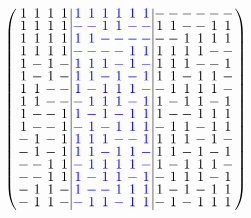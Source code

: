 \documentclass{beamer}
\newcommand{\bblue}[1]{\textcolor{blue}{#1}}
\begin{document}
\begin{frame}

  \[
      \arraycolsep=1.0pt\def\arraystretch{0.75}
      \left(\begin{array}{cccc|cccccc|cccccc}
            1&1&1&1&\bblue{1}&\bblue{1}&\bblue{1}&\bblue{1}&\bblue{1}&\bblue{1}&-&-&-&-&-&-\\
            1&1&1&1&\bblue{-}&\bblue{-}&\bblue{1}&\bblue{1}&\bblue{-}&\bblue{-}&1&1&-&-&1&1\\
            1&1&1&1&\bblue{1}&\bblue{1}&\bblue{-}&\bblue{-}&\bblue{-}&\bblue{-}&-&-&1&1&1&1\\
            1&1&1&1&\bblue{-}&\bblue{-}&\bblue{-}&\bblue{-}&\bblue{1}&\bblue{1}&1&1&1&1&-&-\\
            1&-&1&-&\bblue{1}&\bblue{1}&\bblue{1}&\bblue{-}&\bblue{1}&\bblue{-}&1&1&1&-&-&1\\
            1&-&1&-&\bblue{1}&\bblue{1}&\bblue{-}&\bblue{1}&\bblue{-}&\bblue{1}&1&1&-&1&1&-\\
            1&1&-&-&\bblue{1}&\bblue{-}&\bblue{1}&\bblue{1}&\bblue{1}&\bblue{-}&-&1&1&1&1&-\\
            1&1&-&-&\bblue{-}&\bblue{1}&\bblue{1}&\bblue{1}&\bblue{-}&\bblue{1}&1&-&1&1&-&1\\
            1&-&-&1&\bblue{1}&\bblue{-}&\bblue{1}&\bblue{-}&\bblue{1}&\bblue{1}&1&-&-&1&1&1\\
            1&-&-&1&\bblue{-}&\bblue{1}&\bblue{-}&\bblue{1}&\bblue{1}&\bblue{1}&-&1&1&-&1&1\\
            -&1&-&1&\bblue{1}&\bblue{1}&\bblue{1}&\bblue{-}&\bblue{-}&\bblue{1}&1&1&1&-&1&-\\
            -&1&-&1&\bblue{1}&\bblue{1}&\bblue{-}&\bblue{1}&\bblue{1}&\bblue{-}&1&1&-&1&-&1\\
            -&-&1&1&\bblue{-}&\bblue{1}&\bblue{1}&\bblue{1}&\bblue{1}&\bblue{-}&1&-&1&1&1&-\\
            -&-&1&1&\bblue{1}&\bblue{-}&\bblue{1}&\bblue{1}&\bblue{-}&\bblue{1}&-&1&1&1&-&1\\
            -&1&1&-&\bblue{1}&\bblue{-}&\bblue{-}&\bblue{1}&\bblue{1}&\bblue{1}&1&-&1&-&1&1\\
            -&1&1&-&\bblue{-}&\bblue{1}&\bblue{1}&\bblue{-}&\bblue{1}&\bblue{1}&-&1&-&1&1&1\\
            \end{array}\right)
  \]
  
\end{frame}
\end{document}
